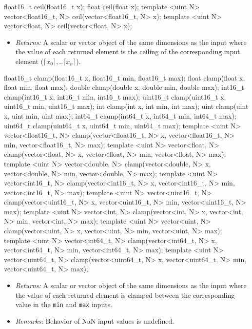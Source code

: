 \begin{HLSL}
float16_t ceil(float16_t x);
float ceil(float x);
template <uint N> vector<float16_t, N> ceil(vector<float16_t, N> x);
template <uint N> vector<float, N> ceil(vector<float, N> x);
\end{HLSL}

\begin{itemize}
  \item \textit{Returns:} A scalar or vector object of the same dimensions as the
  input where the value of each returned element is the ceiling of the
  corresponding input element (\(\lceil x_0 \rceil, .. \lceil x_n \rceil\)).
\end{itemize}

\begin{HLSL}
float16_t clamp(float16_t x, float16_t min, float16_t max);
float clamp(float x, float min, float max);
double clamp(double x, double min, double max);
int16_t clamp(int16_t x, int16_t min, int16_t max);
uint16_t clamp(uint16_t x, uint16_t min, uint16_t max);
int clamp(int x, int min, int max);
uint clamp(uint x, uint min, uint max);
int64_t clamp(int64_t x, int64_t min, int64_t max);
uint64_t clamp(uint64_t x, uint64_t min, uint64_t max);
template <uint N>
vector<float16_t, N> clamp(vector<float16_t, N> x, vector<float16_t, N> min,
                           vector<float16_t, N> max);
template <uint N>
vector<float, N> clamp(vector<float, N> x, vector<float, N> min,
                       vector<float, N> max);
template <uint N>
vector<double, N> clamp(vector<double, N> x, vector<double, N> min,
                        vector<double, N> max);
template <uint N>
vector<int16_t, N> clamp(vector<int16_t, N> x, vector<int16_t, N> min,
                         vector<int16_t, N> max);
template <uint N>
vector<uint16_t, N> clamp(vector<uint16_t, N> x, vector<uint16_t, N> min,
                          vector<uint16_t, N> max);
template <uint N>
vector<int, N> clamp(vector<int, N> x, vector<int, N> min, vector<int, N> max);
template <uint N>
vector<uint, N> clamp(vector<uint, N> x, vector<uint, N> min,
                      vector<uint, N> max);
template <uint N>
vector<int64_t, N> clamp(vector<int64_t, N> x, vector<int64_t, N> min,
                         vector<int64_t, N> max);
template <uint N>
vector<uint64_t, N> clamp(vector<uint64_t, N> x, vector<uint64_t, N> min,
                          vector<uint64_t, N> max);
\end{HLSL}

\begin{itemize}
  \item \textit{Returns:} A scalar or vector object of the same dimensions as
  the input where the value of each returned element is clamped between the
  corresponding value in the \texttt{min} and \texttt{max} inputs.
  \item \textit{Remarks:} Behavior of NaN input values is undefined.
\end{itemize}


